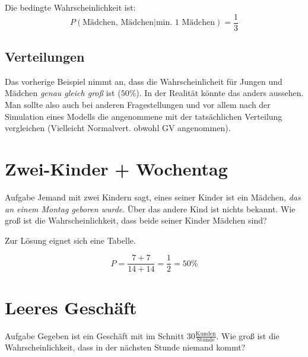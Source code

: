 \documentclass[11pt, a4paper]{article}
\begin{document}
Die bedingte Wahrscheinlichkeit ist:
\[P(\text{Mädchen, Mädchen} | \text{min. 1 Mädchen}) = \frac{1}{3}\]


\subsection{Verteilungen}
Das vorherige Beispiel nimmt an, dass die Wahrscheinlicheit für Jungen und Mädchen \emph{genau gleich groß} ist ($50\%$). In der Realität könnte das anders aussehen. Man sollte also auch bei anderen Fragestellungen und vor allem nach der Simulation eines Modells die angenommene mit der tatsächlichen Verteilung vergleichen (Vielleicht Normalvert. obwohl GV angenommen).

\section{Zwei-Kinder + Wochentag}
\begin{zitat}{Aufgabe}
  Jemand mit zwei Kindern sagt, eines seiner Kinder ist ein Mädchen, \emph{das an einem Montag geboren wurde}. Über das andere Kind ist nichts bekannt. Wie groß ist die Wahrscheinlichkeit, dass beide seiner Kinder Mädchen sind?
\end{zitat}

Zur Lösung eignet sich eine Tabelle.

\begin{figure}[H]
\centering
{}
\end{figure}

\[P = \frac{7 + 7}{14 + 14} = \frac{1}{2} = 50 \%\]

\section{\glqq Leeres Geschäft\grqq}
\begin{zitat}{Aufgabe}
Gegeben ist ein Geschäft mit im Schnitt $30 \frac{\text{Kunden}}{\text{Stunde}}$. Wie groß ist die Wahrscheinlichkeit, dass in der nächsten Stunde niemand kommt?
\end{zitat}
\end{document}
